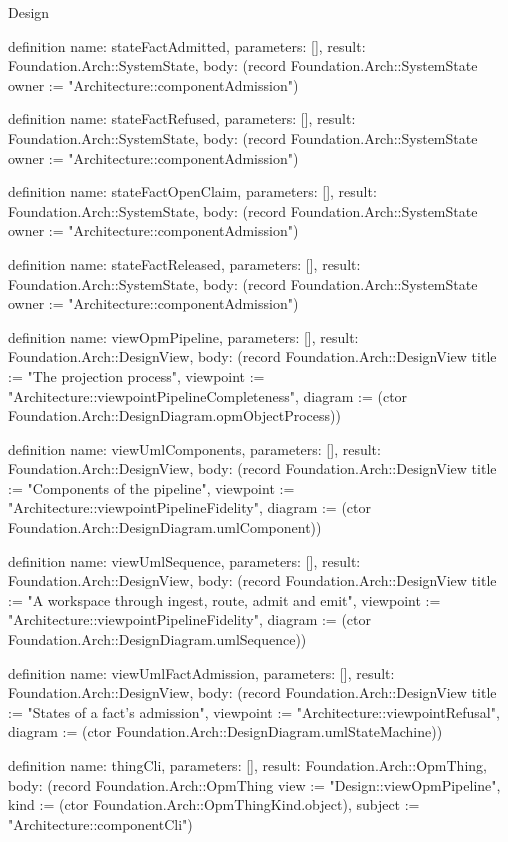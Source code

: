 \begin{lexlean}{Design}
\begin{semanticmodule}
definition{
  name: stateFactAdmitted,
  parameters: [],
  result: Foundation.Arch::SystemState,
  body: (record Foundation.Arch::SystemState {owner := "Architecture::componentAdmission"})
}

definition{
  name: stateFactRefused,
  parameters: [],
  result: Foundation.Arch::SystemState,
  body: (record Foundation.Arch::SystemState {owner := "Architecture::componentAdmission"})
}

definition{
  name: stateFactOpenClaim,
  parameters: [],
  result: Foundation.Arch::SystemState,
  body: (record Foundation.Arch::SystemState {owner := "Architecture::componentAdmission"})
}

definition{
  name: stateFactReleased,
  parameters: [],
  result: Foundation.Arch::SystemState,
  body: (record Foundation.Arch::SystemState {owner := "Architecture::componentAdmission"})
}

definition{
  name: viewOpmPipeline,
  parameters: [],
  result: Foundation.Arch::DesignView,
  body: (record Foundation.Arch::DesignView {title := "The projection process", viewpoint := "Architecture::viewpointPipelineCompleteness", diagram := (ctor Foundation.Arch::DesignDiagram.opmObjectProcess)})
}

definition{
  name: viewUmlComponents,
  parameters: [],
  result: Foundation.Arch::DesignView,
  body: (record Foundation.Arch::DesignView {title := "Components of the pipeline", viewpoint := "Architecture::viewpointPipelineFidelity", diagram := (ctor Foundation.Arch::DesignDiagram.umlComponent)})
}

definition{
  name: viewUmlSequence,
  parameters: [],
  result: Foundation.Arch::DesignView,
  body: (record Foundation.Arch::DesignView {title := "A workspace through ingest, route, admit and emit", viewpoint := "Architecture::viewpointPipelineFidelity", diagram := (ctor Foundation.Arch::DesignDiagram.umlSequence)})
}

definition{
  name: viewUmlFactAdmission,
  parameters: [],
  result: Foundation.Arch::DesignView,
  body: (record Foundation.Arch::DesignView {title := "States of a fact's admission", viewpoint := "Architecture::viewpointRefusal", diagram := (ctor Foundation.Arch::DesignDiagram.umlStateMachine)})
}

definition{
  name: thingCli,
  parameters: [],
  result: Foundation.Arch::OpmThing,
  body: (record Foundation.Arch::OpmThing {view := "Design::viewOpmPipeline", kind := (ctor Foundation.Arch::OpmThingKind.object), subject := "Architecture::componentCli"})
}


\end{semanticmodule}
\end{lexlean}
